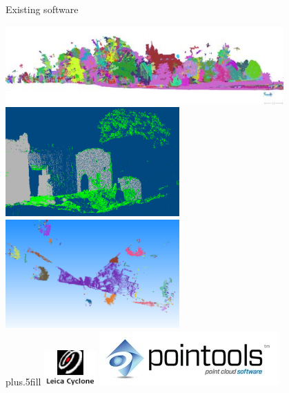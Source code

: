 \documentclass[compress]{beamer}
\begin{document}
\begin{frame}{Existing software}
\centering

\includegraphics[width=0.8\textwidth]{pics/3DReshaper_auto_pt_cloud_seg.jpg}
\\
\includegraphics[width=0.50\textwidth]{pics/vrmesh-veg.png}
\includegraphics[width=0.50\textwidth]{pics/clustering.png}
\\
\vskip0pt plus.5fill
\includegraphics[height=0.10\textheight]{pics/cyclone.jpg}
\includegraphics[height=0.10\textheight]{pics/pointools.jpg}

\end{frame}
\end{document}
